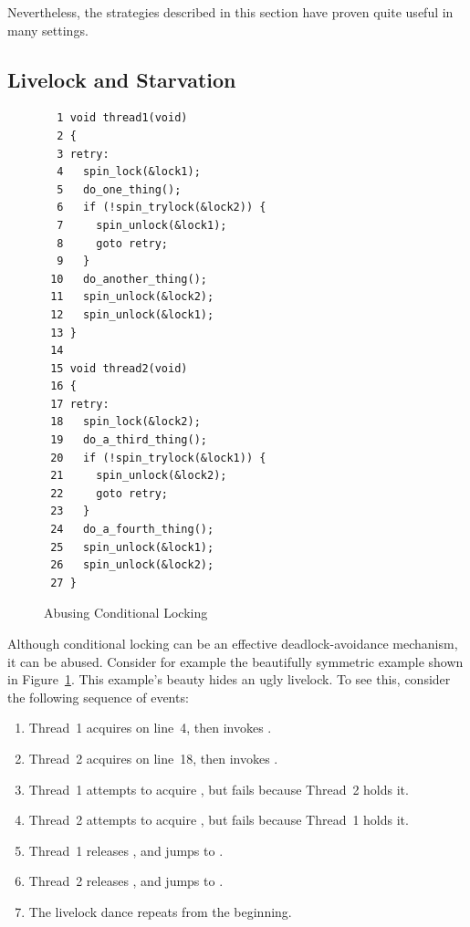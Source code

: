 Nevertheless, the strategies described in this section have proven
quite useful in many settings.

\subsection{Livelock and Starvation}
\label{sec:locking:Livelock and Starvation}

\begin{figure}[tbp]
{ \scriptsize
\begin{verbatim}
  1 void thread1(void)
  2 {
  3 retry:
  4   spin_lock(&lock1);
  5   do_one_thing();
  6   if (!spin_trylock(&lock2)) {
  7     spin_unlock(&lock1);
  8     goto retry;
  9   }
 10   do_another_thing();
 11   spin_unlock(&lock2);
 12   spin_unlock(&lock1);
 13 }
 14 
 15 void thread2(void)
 16 {
 17 retry:
 18   spin_lock(&lock2);
 19   do_a_third_thing();
 20   if (!spin_trylock(&lock1)) {
 21     spin_unlock(&lock2);
 22     goto retry;
 23   }
 24   do_a_fourth_thing();
 25   spin_unlock(&lock1);
 26   spin_unlock(&lock2);
 27 }
\end{verbatim}
}
\caption{Abusing Conditional Locking}
\label{fig:locking:Abusing Conditional Locking}
\end{figure}

Although conditional locking can be an effective deadlock-avoidance
mechanism, it can be abused.
Consider for example the beautifully symmetric example shown in
Figure~\ref{fig:locking:Abusing Conditional Locking}.
This example's beauty hides an ugly livelock.
To see this, consider the following sequence of events:

\begin{enumerate}
\item	Thread~1 acquires  on line~4, then invokes
	.
\item	Thread~2 acquires  on line~18, then invokes
	.
\item	Thread~1 attempts to acquire , but fails because
	Thread~2 holds it.
\item	Thread~2 attempts to acquire , but fails because
	Thread~1 holds it.
\item	Thread~1 releases , and jumps to .
\item	Thread~2 releases , and jumps to .
\item	The livelock dance repeats from the beginning.
\end{enumerate}

